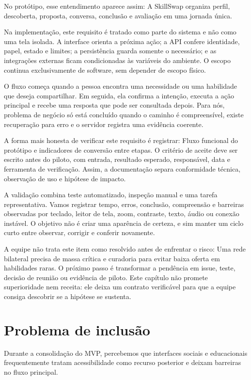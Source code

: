 \documentclass[12pt,oneside,a4paper,article]{abntex2}
\begin{document}
No protótipo, esse entendimento aparece assim: A SkillSwap organiza perfil, descoberta, proposta, conversa, conclusão e avaliação em uma jornada única.

Na implementação, este requisito é tratado como parte do sistema e não como uma tela isolada. A interface orienta a próxima ação; a API confere identidade, papel, estado e limites; a persistência guarda somente o necessário; e as integrações externas ficam condicionadas às variáveis do ambiente. O escopo continua exclusivamente de software, sem depender de escopo físico.

O fluxo começa quando a pessoa encontra uma necessidade ou uma habilidade que deseja compartilhar. Em seguida, ela confirma a intenção, executa a ação principal e recebe uma resposta que pode ser consultada depois. Para nós, problema de negócio só está concluído quando o caminho é compreensível, existe recuperação para erro e o servidor registra uma evidência coerente.

A forma mais honesta de verificar este requisito é registrar: Fluxo funcional do protótipo e indicadores de conversão entre etapas. O critério de aceite deve ser escrito antes do piloto, com entrada, resultado esperado, responsável, data e ferramenta de verificação. Assim, a documentação separa conformidade técnica, observação de uso e hipótese de impacto.

A validação combina teste automatizado, inspeção manual e uma tarefa representativa. Vamos registrar tempo, erros, conclusão, compreensão e barreiras observadas por teclado, leitor de tela, zoom, contraste, texto, áudio ou conexão instável. O objetivo não é criar uma aparência de certeza, e sim manter um ciclo curto entre observar, corrigir e conferir novamente.

A equipe não trata este item como resolvido antes de enfrentar o risco: Uma rede bilateral precisa de massa crítica e curadoria para evitar baixa oferta em habilidades raras. O próximo passo é transformar a pendência em issue, teste, decisão de reunião ou evidência de piloto. Este capítulo não promete superioridade nem receita: ele deixa um contrato verificável para que a equipe consiga descobrir se a hipótese se sustenta.

\section{Problema de inclusão}
Durante a consolidação do MVP, percebemos que interfaces sociais e educacionais frequentemente tratam acessibilidade como recurso posterior e deixam barreiras no fluxo principal.
\end{document}
